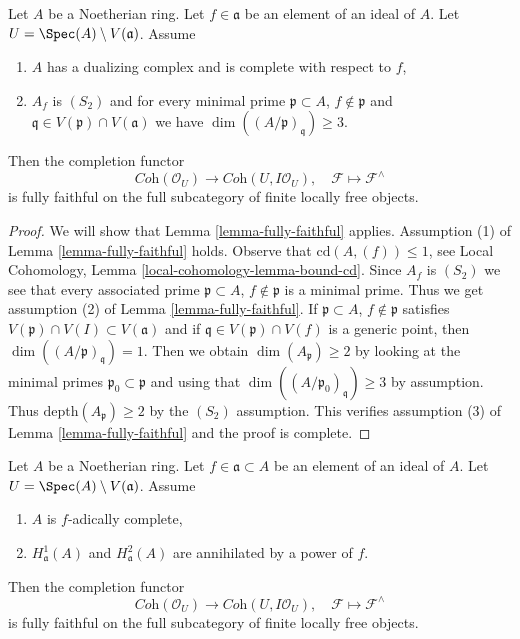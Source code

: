 \begin{lemma}
\label{lemma-fully-faithful-simple-one}
Let $A$ be a Noetherian ring. Let $f \in \mathfrak a$ be an element of
an ideal of $A$. Let $U = \Spec(A) \setminus V(\mathfrak a)$. Assume
\begin{enumerate}
\item $A$ has a dualizing complex and is complete with respect to $f$,
\item $A_f$ is $(S_2)$ and for every minimal prime $\mathfrak p \subset A$,
$f \not \in \mathfrak p$ and
$\mathfrak q \in V(\mathfrak p) \cap V(\mathfrak a)$ we have
$\dim((A/\mathfrak p)_\mathfrak q) \geq 3$.
\end{enumerate}
Then the completion functor
$$
\textit{Coh}(\mathcal{O}_U)
\longrightarrow
\textit{Coh}(U, I\mathcal{O}_U),
\quad
\mathcal{F} \longmapsto \mathcal{F}^\wedge
$$
is fully faithful on the full subcategory of finite locally free objects.
\end{lemma}

\begin{proof}
We will show that Lemma \ref{lemma-fully-faithful} applies.
Assumption (1) of Lemma \ref{lemma-fully-faithful} holds.
Observe that $\text{cd}(A, (f)) \leq 1$, see
Local Cohomology, Lemma \ref{local-cohomology-lemma-bound-cd}.
Since $A_f$ is $(S_2)$ we see that every associated prime
$\mathfrak p \subset A$, $f \not \in \mathfrak p$ is a minimal prime.
Thus we get assumption (2) of Lemma \ref{lemma-fully-faithful}.
If $\mathfrak p \subset A$, $f \not \in \mathfrak p$ satisfies
$V(\mathfrak p) \cap V(I) \subset V(\mathfrak a)$ and if
$\mathfrak q \in V(\mathfrak p) \cap V(f)$ is a generic point,
then $\dim((A/\mathfrak p)_\mathfrak q) = 1$.
Then we obtain $\dim(A_\mathfrak p) \geq 2$ by looking at the minimal primes
$\mathfrak p_0 \subset \mathfrak p$ and using that
$\dim((A/\mathfrak p_0)_\mathfrak q) \geq 3$ by assumption. Thus
$\text{depth}(A_\mathfrak p) \geq 2$ by the $(S_2)$ assumption.
This verifies assumption (3) of Lemma \ref{lemma-fully-faithful}
and the proof is complete.
\end{proof}

\begin{lemma}
\label{lemma-fully-faithful-alternative}
Let $A$ be a Noetherian ring. Let $f \in \mathfrak a \subset A$
be an element of an ideal of $A$. Let $U = \Spec(A) \setminus V(\mathfrak a)$.
Assume
\begin{enumerate}
\item $A$ is $f$-adically complete,
\item $H^1_\mathfrak a(A)$ and $H^2_\mathfrak a(A)$ are
annihilated by a power of $f$.
\end{enumerate}
Then the completion functor
$$
\textit{Coh}(\mathcal{O}_U)
\longrightarrow
\textit{Coh}(U, I\mathcal{O}_U),
\quad
\mathcal{F} \longmapsto \mathcal{F}^\wedge
$$
is fully faithful on the full subcategory of
finite locally free objects.
\end{lemma}

